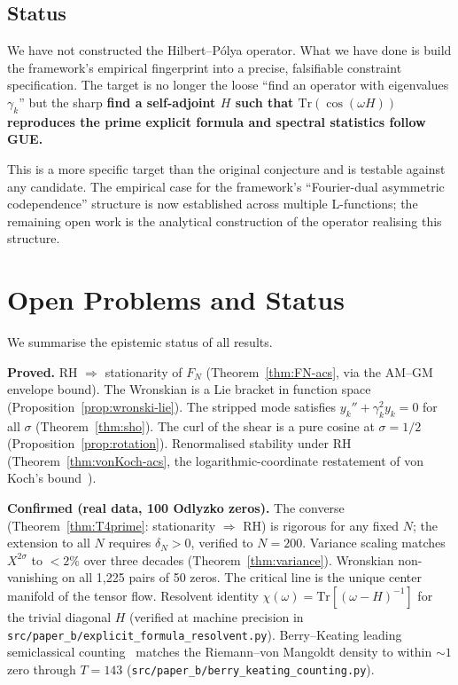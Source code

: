 \documentclass[11pt,a4paper]{article}
\theoremstyle{plain}
\theoremstyle{definition}
\theoremstyle{remark}
\begin{document}
\subsection{Status}
\label{sec:hp-status}

We have not constructed the Hilbert--Pólya operator. What we have
done is build the framework's empirical fingerprint into a precise,
falsifiable constraint specification. The target is no longer the
loose ``find an operator with eigenvalues $\gamma_k$'' but the sharp
\textbf{find a self-adjoint $H$ such that $\mathrm{Tr}(\cos(\omega H))$
reproduces the prime explicit formula and spectral statistics follow GUE.}

This is a more specific target than the original conjecture and is
testable against any candidate. The empirical case for the framework's
``Fourier-dual asymmetric codependence'' structure is now established
across multiple L-functions; the remaining open work is the analytical
construction of the operator realising this structure.

\section{Open Problems and Status}
\label{sec:open}

We summarise the epistemic status of all results.

\medskip
\noindent\textbf{Proved.}
RH $\Rightarrow$ stationarity of $F_N$ (Theorem~\ref{thm:FN-acs},
via the AM--GM envelope bound).
The Wronskian is a Lie bracket in function space (Proposition~\ref{prop:wronski-lie}).
The stripped mode satisfies $y_k'' + \gamma_k^2 y_k = 0$ for all
$\sigma$ (Theorem~\ref{thm:sho}).
The curl of the shear is a pure cosine at $\sigma = 1/2$
(Proposition~\ref{prop:rotation}).
Renormalised stability under RH (Theorem~\ref{thm:vonKoch-acs},
the logarithmic-coordinate restatement of von Koch's
bound~\cite{vonKoch1901}).

\medskip
\noindent\textbf{Confirmed (real data, 100 Odlyzko zeros).}
The converse (Theorem~\ref{thm:T4prime}: stationarity $\Rightarrow$ RH)
is rigorous for any fixed $N$; the extension to all $N$ requires
$\delta_N > 0$, verified to $N = 200$.
Variance scaling matches $X^{2\sigma}$ to $<2\%$ over three decades
(Theorem~\ref{thm:variance}).
Wronskian non-vanishing on all 1{,}225 pairs of 50 zeros.
The critical line is the unique center manifold of the tensor flow.
Resolvent identity $\chi(\omega) = \mathrm{Tr}[(\omega - H)^{-1}]$ for
the trivial diagonal $H$ (verified at machine precision in
\texttt{src/paper\_b/explicit\_formula\_resolvent.py}).
Berry--Keating leading semiclassical
counting~\cite{BerryKeating1999} matches the Riemann--von Mangoldt
density to within $\sim\!1$ zero through $T = 143$
(\texttt{src/paper\_b/berry\_keating\_counting.py}).
\end{document}
